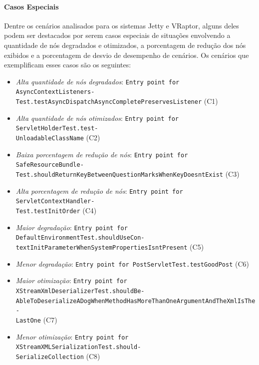 \paragraph{Casos Especiais}

Dentre os cenários analisados para os sistemas Jetty e VRaptor, alguns deles podem ser destacados por serem casos especiais de situações envolvendo a quantidade de nós degradados e otimizados, a porcentagem de redução dos nós exibidos e a porcentagem de desvio de desempenho de cenários. Os cenários que exemplificam esses casos são os seguintes:
\begin{itemize}
  \item \textit{Alta quantidade de nós degradados}: \texttt{Entry point for AsyncContextListeners-\\Test.testAsyncDispatchAsyncCompletePreservesListener} (C1)
  \item \textit{Alta quantidade de nós otimizados}:  \texttt{Entry point for ServletHolderTest.test-\\UnloadableClassName} (C2)
  \item \textit{Baixa porcentagem de redução de nós}: \texttt{Entry point for SafeResourceBundle-\\Test.shouldReturnKeyBetweenQuestionMarksWhenKeyDoesntExist} (C3)
  \item \textit{Alta porcentagem de redução de nós}: \texttt{Entry point for ServletContextHandler-\\Test.testInitOrder} (C4)
  \item \textit{Maior degradação}: \texttt{Entry point for DefaultEnvironmentTest.shouldUseCon-\\textInitParameterWhenSystemPropertiesIsntPresent} (C5)
  \item \textit{Menor degradação}: \texttt{Entry point for PostServletTest.testGoodPost} (C6)
  \item \textit{Maior otimização}: \texttt{Entry point for XStreamXmlDeserializerTest.shouldBe-\\AbleToDeserializeADogWhenMethodHasMoreThanOneArgumentAndTheXmlIsThe-\\LastOne} (C7)
  \item \textit{Menor otimização}: \texttt{Entry point for XStreamXMLSerializationTest.should-\\SerializeCollection} (C8)
\end{itemize}

